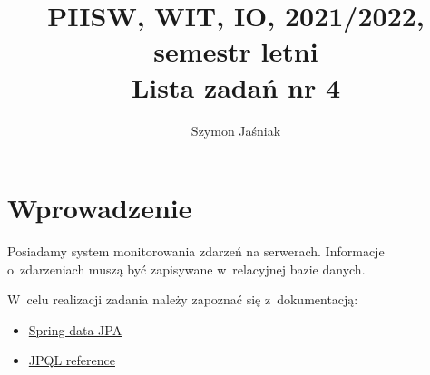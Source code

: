 \documentclass[12pt]{article}
\title{PIISW, WIT, IO, 2021/2022, semestr letni\\Lista zadań nr 4}
\author{Szymon Jaśniak}
\begin{document}
    \maketitle

    \section*{Wprowadzenie}
        Posiadamy system monitorowania zdarzeń na serwerach. Informacje o~zdarzeniach muszą być zapisywane w~relacyjnej bazie danych.

        W~celu realizacji zadania należy zapoznać się z~dokumentacją:
        \begin{itemize}
            \item \href{https://docs.spring.io/spring-data/jpa/docs/current/reference/html/}{Spring data JPA}
            \item \href{https://docs.oracle.com/javaee/7/tutorial/partpersist.htm#BNBPY}{JPQL reference}
        \end{itemize}
\end{document}

